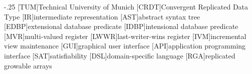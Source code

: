 \documentclass[headsepline,footsepline,footinclude=false,oneside,fontsize=11pt,paper=a4,listof=totoc,bibliography=totoc]{scrbook} %
\begin{document}


\frontmatter{}





\tableofcontents{}

\mainmatter{}








\appendix{}


\begin{acronym}
    \itemsep-.25\baselineskip
    [TUM]{Technical University of Munich}
    [CRDT]{Convergent Replicated Data Type}
    [IR]{intermediate representation}
    [AST]{abstract syntax tree}
    [EDBP]{extensional database predicate}
    [IDBP]{intensional database predicate}
    [MVR]{multi-valued register}
    [LWWR]{last-writer-wins register}
    [IVM]{incremental view maintenance}
    [GUI]{graphical user interface}
    [API]{application programming interface}
    [SAT]{satisfiability}
    [DSL]{domain-specific language}
    [RGA]{replicated growable arrays}
\end{acronym}

\listoffigures{}
\printbibliography{}
\end{document}
